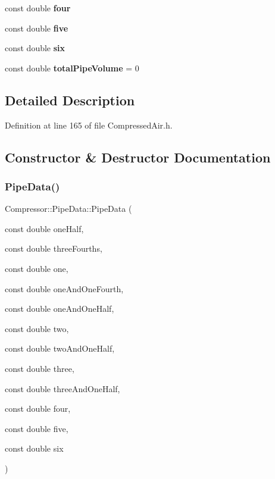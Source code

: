 \begin{DoxyCompactItemize}
const double {\bfseries four}
\item 
\mbox{\label{struct_compressor_1_1_pipe_data_aa4ca33456ade4559b80bdc55d785ca12}} 
const double {\bfseries five}
\item 
\mbox{\label{struct_compressor_1_1_pipe_data_acabd73fa371dec551937b5d9f7718317}} 
const double {\bfseries six}
\item 
\mbox{\label{struct_compressor_1_1_pipe_data_aa290d5d7f31c6b74f65b22d81b4ebf84}} 
const double {\bfseries total\+Pipe\+Volume} = 0
\end{DoxyCompactItemize}


\subsection{Detailed Description}


Definition at line 165 of file Compressed\+Air.\+h.



\subsection{Constructor \& Destructor Documentation}
\mbox{\label{struct_compressor_1_1_pipe_data_a71acdc81e25bd90b51361bf8d4f0ed38}} 
\subsubsection{\texorpdfstring{Pipe\+Data()}{PipeData()}\hspace{0.1cm}{\footnotesize\ttfamily [1/6]}}
{\footnotesize\ttfamily Compressor\+::\+Pipe\+Data\+::\+Pipe\+Data (\begin{DoxyParamCaption}\item[{const double}]{one\+Half,  }\item[{const double}]{three\+Fourths,  }\item[{const double}]{one,  }\item[{const double}]{one\+And\+One\+Fourth,  }\item[{const double}]{one\+And\+One\+Half,  }\item[{const double}]{two,  }\item[{const double}]{two\+And\+One\+Half,  }\item[{const double}]{three,  }\item[{const double}]{three\+And\+One\+Half,  }\item[{const double}]{four,  }\item[{const double}]{five,  }\item[{const double}]{six }\end{DoxyParamCaption})\hspace{0.3cm}{\ttfamily [inline]}}

